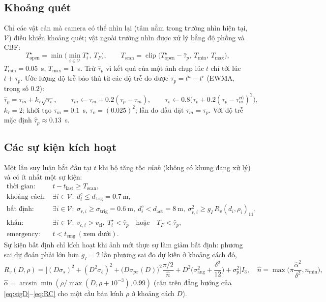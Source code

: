\documentclass[11pt,a4paper]{article}
\numberwithin{equation}{section}
\newcommand{\clip}{\operatorname{clip}}
\theoremstyle{definition}
\theoremstyle{plain}
\theoremstyle{remark}
\begin{document}
\subsection{Khoảng quét}
Chỉ các vật cản mà camera có thể nhìn lại (tâm nằm trong trường nhìn hiện tại, $\mathcal V$) điều khiển khoảng quét; vật ngoài trường nhìn được xử lý bằng độ phồng và CBF:
\begin{equation}
T^\star_{\text{open}}=\min\Big(\min_{i\in\mathcal V}T^\star_i,\ T_F\Big),\qquad
T_{\text{scan}}=\clip\big(T^\star_{\text{open}}-\hat\tau_p,\ T_{\min},\ T_{\max}\big), \label{eq:Tscan}
\end{equation}
$T_{\min}=0.05$~s, $T_{\max}=1$~s. Trừ $\hat\tau_p$ vì kết quả của một ảnh chụp lúc $t$ chỉ tới lúc $t+\tau_p$. Ước lượng độ trễ bảo thủ từ các độ trễ đo được $\tau_p=t^a-t^c$ (EWMA, trọng số $0.2$):
\begin{equation}
\hat\tau_p=\tau_m+k_\tau\sqrt{\tau_v},\qquad \tau_m\leftarrow\tau_m+0.2(\tau_p-\tau_m),\qquad \tau_v\leftarrow0.8\big(\tau_v+0.2(\tau_p-\tau_m^{\text{cũ}})^2\big), \label{eq:tauhat}
\end{equation}
$k_\tau=2$; khởi tạo $\tau_m=0.1$~s, $\tau_v=(0.025)^2$; lần đo đầu đặt $\tau_m=\tau_p$. Với độ trễ mặc định $\hat\tau_p\approx0.13$~s.

\subsection{Các sự kiện kích hoạt}
\label{sec:events}
Một lần suy luận bắt đầu tại $t$ khi bộ tăng tốc \emph{rảnh} (không có khung đang xử lý) và có ít nhất một sự kiện:
\begin{align}
\text{thời gian:}\quad & t-t_{\text{last}}\ge T_{\text{scan}}, \label{eq:events}\\
\text{khoảng cách:}\quad & \exists i\in\mathcal V:\ d^c_i\le d_{\text{trig}}=0.7~\text{m}, \nonumber\\
\text{bất định:}\quad & \exists i\in\mathcal V:\ \sigma_{r,i}\ge\sigma_{\text{trig}}=0.6~\text{m},\ d^c_i<d_{\text{act}}=8~\text{m},\ \sigma_{r,i}^2\ge g_I\,R_v(d_i,\rho_i)_{11}, \nonumber\\
\text{khẩn:}\quad & \exists i\in\mathcal V:\ v_{c,i}>v_{\text{cl}},\ T^\star_i<\hat\tau_p\quad\text{hoặc}\quad T_F<\hat\tau_p, \nonumber\\
\text{emergency:}\quad & t<t_{\text{emg}}\ (\text{xem dưới}). \nonumber
\end{align}
Sự kiện bất định chỉ kích hoạt khi ảnh mới thực sự làm giảm bất định: phương sai dự đoán phải lớn hơn $g_I=2$ lần phương sai đo dự kiến ở khoảng cách đó,
\begin{equation}
R_v(D,\rho)=\Big[(D\sigma_s)^2+(D^2\sigma_b)^2+\big(D\sigma_{px}(D)\big)^2\frac{\pi/2}{\hat n}+D^2\Big(\sigma_{\text{ang}}^2+\frac{\delta^2}{12}\Big)+\sigma_p^2\Big]I_3,\quad
\hat n=\max\!\Big(\pi\frac{\hat\alpha^2}{\delta^2},n_{\min}\Big), \label{eq:Rv}
\end{equation}
$\hat\alpha=\arcsin\min(\rho/\max(D,\rho+10^{-3}),0.99)$ (cận trên đẳng hướng của \eqref{eq:sigD}--\eqref{eq:RC} cho một cầu bán kính $\rho$ ở khoảng cách $D$).
\end{document}
